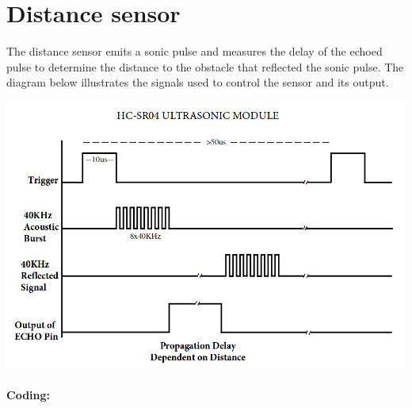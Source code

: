 \documentclass[12pt]{book}
\begin{document}
\section{Distance sensor}

The distance sensor emits a sonic pulse and measures the delay of the
echoed pulse to determine the distance to the obstacle that reflected
the sonic pulse. The diagram below illustrates the signals used to
control the sensor and its output.

\includegraphics[width=.7\textwidth]{figs/8-hc-sr04-timing.png}

\paragraph{Coding:}
\end{document}
